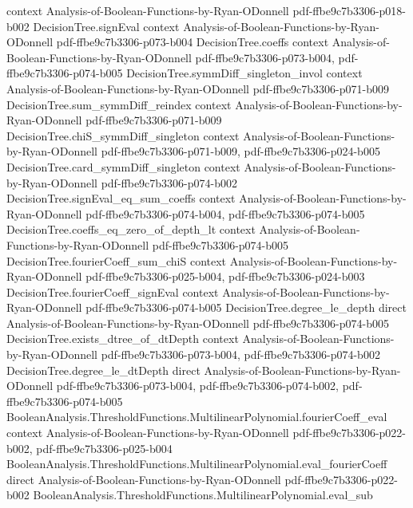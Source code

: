 \begin{lemma}
  {context}
  {Analysis-of-Boolean-Functions-by-Ryan-ODonnell}
  {pdf-ffbe9c7b3306-p018-b002}
\proofstep
  {DecisionTree.signEval}
  {context}
  {Analysis-of-Boolean-Functions-by-Ryan-ODonnell}
  {pdf-ffbe9c7b3306-p073-b004}
\proofstep
  {DecisionTree.coeffs}
  {context}
  {Analysis-of-Boolean-Functions-by-Ryan-ODonnell}
  {pdf-ffbe9c7b3306-p073-b004,
    pdf-ffbe9c7b3306-p074-b005}
\proofstep
  {DecisionTree.symmDiff_singleton_invol}
  {context}
  {Analysis-of-Boolean-Functions-by-Ryan-ODonnell}
  {pdf-ffbe9c7b3306-p071-b009}
\proofstep
  {DecisionTree.sum_symmDiff_reindex}
  {context}
  {Analysis-of-Boolean-Functions-by-Ryan-ODonnell}
  {pdf-ffbe9c7b3306-p071-b009}
\proofstep
  {DecisionTree.chiS_symmDiff_singleton}
  {context}
  {Analysis-of-Boolean-Functions-by-Ryan-ODonnell}
  {pdf-ffbe9c7b3306-p071-b009,
    pdf-ffbe9c7b3306-p024-b005}
\proofstep
  {DecisionTree.card_symmDiff_singleton}
  {context}
  {Analysis-of-Boolean-Functions-by-Ryan-ODonnell}
  {pdf-ffbe9c7b3306-p074-b002}
\proofstep
  {DecisionTree.signEval_eq_sum_coeffs}
  {context}
  {Analysis-of-Boolean-Functions-by-Ryan-ODonnell}
  {pdf-ffbe9c7b3306-p074-b004,
    pdf-ffbe9c7b3306-p074-b005}
\proofstep
  {DecisionTree.coeffs_eq_zero_of_depth_lt}
  {context}
  {Analysis-of-Boolean-Functions-by-Ryan-ODonnell}
  {pdf-ffbe9c7b3306-p074-b005}
\proofstep
  {DecisionTree.fourierCoeff_sum_chiS}
  {context}
  {Analysis-of-Boolean-Functions-by-Ryan-ODonnell}
  {pdf-ffbe9c7b3306-p025-b004,
    pdf-ffbe9c7b3306-p024-b003}
\proofstep
  {DecisionTree.fourierCoeff_signEval}
  {context}
  {Analysis-of-Boolean-Functions-by-Ryan-ODonnell}
  {pdf-ffbe9c7b3306-p074-b005}
\proofstep
  {DecisionTree.degree_le_depth}
  {direct}
  {Analysis-of-Boolean-Functions-by-Ryan-ODonnell}
  {pdf-ffbe9c7b3306-p074-b005}
\proofstep
  {DecisionTree.exists_dtree_of_dtDepth}
  {context}
  {Analysis-of-Boolean-Functions-by-Ryan-ODonnell}
  {pdf-ffbe9c7b3306-p073-b004,
    pdf-ffbe9c7b3306-p074-b002}
\proofstep
  {DecisionTree.degree_le_dtDepth}
  {direct}
  {Analysis-of-Boolean-Functions-by-Ryan-ODonnell}
  {pdf-ffbe9c7b3306-p073-b004,
    pdf-ffbe9c7b3306-p074-b002,
    pdf-ffbe9c7b3306-p074-b005}
\proofstep
  {BooleanAnalysis.ThresholdFunctions.MultilinearPolynomial.fourierCoeff_eval}
  {context}
  {Analysis-of-Boolean-Functions-by-Ryan-ODonnell}
  {pdf-ffbe9c7b3306-p022-b002,
    pdf-ffbe9c7b3306-p025-b004}
\proofstep
  {BooleanAnalysis.ThresholdFunctions.MultilinearPolynomial.eval_fourierCoeff}
  {direct}
  {Analysis-of-Boolean-Functions-by-Ryan-ODonnell}
  {pdf-ffbe9c7b3306-p022-b002}
\proofstep
  {BooleanAnalysis.ThresholdFunctions.MultilinearPolynomial.eval_sub}

\end{lemma}
